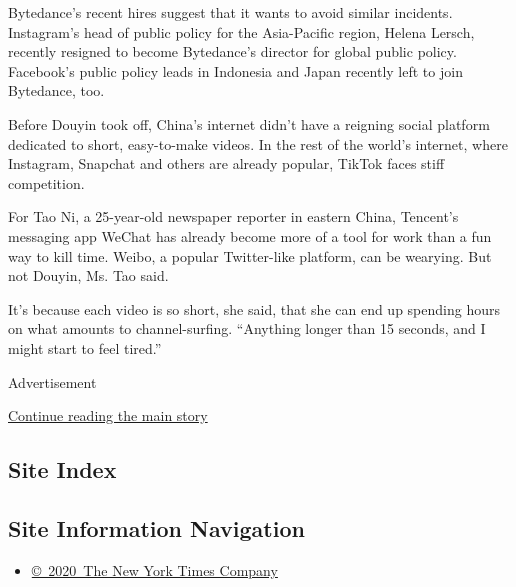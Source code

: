 Bytedance's recent hires suggest that it wants to avoid similar
incidents. Instagram's head of public policy for the Asia-Pacific
region, Helena Lersch, recently resigned to become Bytedance's director
for global public policy. Facebook's public policy leads in Indonesia
and Japan recently left to join Bytedance, too.

Before Douyin took off, China's internet didn't have a reigning social
platform dedicated to short, easy-to-make videos. In the rest of the
world's internet, where Instagram, Snapchat and others are already
popular, TikTok faces stiff competition.

For Tao Ni, a 25-year-old newspaper reporter in eastern China, Tencent's
messaging app WeChat has already become more of a tool for work than a
fun way to kill time. Weibo, a popular Twitter-like platform, can be
wearying. But not Douyin, Ms. Tao said.

It's because each video is so short, she said, that she can end up
spending hours on what amounts to channel-surfing. ``Anything longer
than 15 seconds, and I might start to feel tired.''

Advertisement

\protect\hyperlink{after-bottom}{Continue reading the main story}

\hypertarget{site-index}{%
\subsection{Site Index}\label{site-index}}

\hypertarget{site-information-navigation}{%
\subsection{Site Information
Navigation}\label{site-information-navigation}}

\begin{itemize}
\tightlist
\item
  \href{https://help.nytimes3xbfgragh.onion/hc/en-us/articles/115014792127-Copyright-notice}{©~2020~The
  New York Times Company}
\end{itemize}

